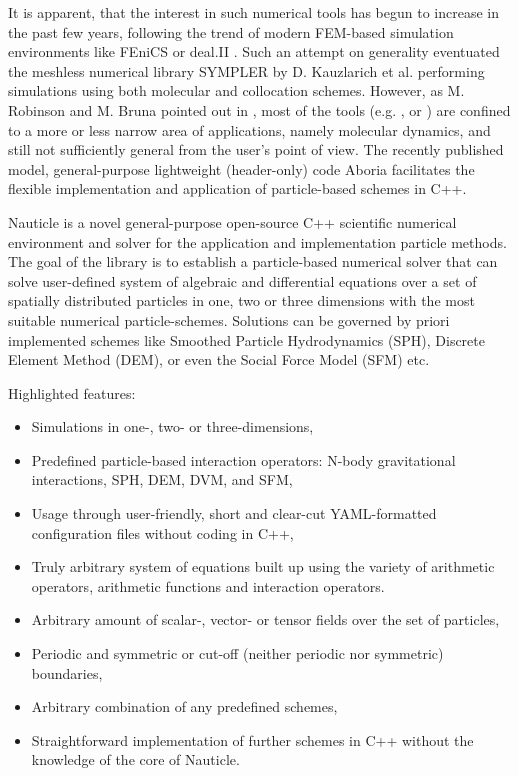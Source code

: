 \documentclass[a4paper,12pt,openany]{book}
\theoremstyle{break}
\begin{document}
It is apparent, that the interest in such numerical tools has begun to increase in the past few years, following the trend of modern FEM-based simulation environments like FEniCS \cite{Fenics} or deal.II \cite{deal2}. Such an attempt on generality eventuated the meshless numerical library SYMPLER by D. Kauzlarich et al. \cite{SYMPLER} performing simulations using both molecular and collocation schemes. However, as M. Robinson and M. Bruna pointed out in \cite{Aboria}, most of the tools (e.g. \cite{LAMMPS}, \cite{ESPResSo} or \cite{GROMACS}) are confined to a more or less narrow area of applications, namely molecular dynamics, and still not sufficiently general from the user's point of view. The recently published model, general-purpose lightweight (header-only) code Aboria \cite{Aboria} facilitates the flexible implementation and application of particle-based schemes in C++. 

Nauticle is a novel general-purpose open-source C++ scientific numerical environment and solver for the application and implementation particle methods. The goal of the library is to establish a particle-based numerical solver that can solve user-defined system of algebraic and differential equations over a set of spatially distributed particles in one, two or three dimensions with the most suitable numerical particle-schemes. Solutions can be governed by priori implemented schemes like Smoothed Particle Hydrodynamics (SPH), Discrete Element Method (DEM), or even the Social Force Model (SFM) etc.

Highlighted features:
\begin{itemize}
  \item Simulations in one-, two- or three-dimensions,
  \item Predefined particle-based interaction operators: N-body gravitational interactions, SPH, DEM, DVM, and SFM,
  \item Usage through user-friendly, short and clear-cut YAML-formatted configuration files without coding in C++,
  \item Truly arbitrary system of equations built up using the variety of arithmetic operators, arithmetic functions and interaction operators.
  \item Arbitrary amount of scalar-, vector- or tensor fields over the set of particles,
  \item Periodic and symmetric or cut-off (neither periodic nor symmetric) boundaries,
  \item Arbitrary combination of any predefined schemes,
  \item Straightforward implementation of further schemes in C++ without the knowledge of the core of Nauticle.
\end{itemize}
\end{document}
